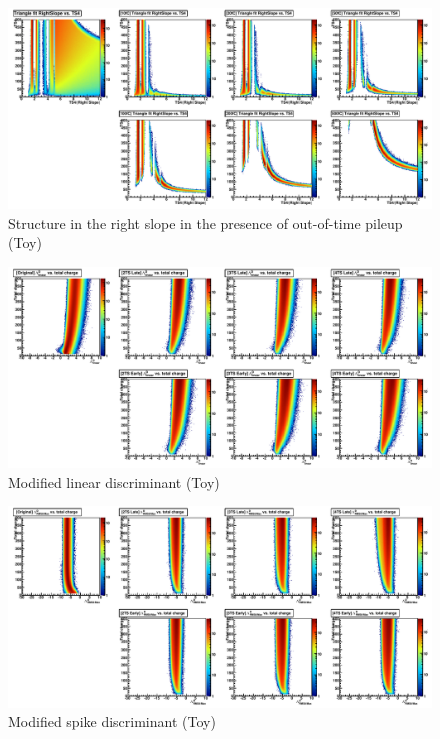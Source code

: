 \begin{figure}
   \includegraphics[width=120mm]{DailyLog/6411/6411_Toys75LateScanRightSlope.pdf}
   \caption{Structure in the right slope in the presence of out-of-time pileup (Toy)}
   \label{Figure_6411_Toys75LateScanRightSlope}
\end{figure}

\begin{figure}
   \includegraphics[width=120mm]{DailyLog/6411/6411_ToysAllChargeLambdaDLinear.pdf}
   \caption{Modified linear discriminant (Toy)}
   \label{Figure_6411_ToysAllChargeLambdaDLinear}
\end{figure}

\begin{figure}
   \includegraphics[width=120mm]{DailyLog/6411/6411_ToysAllChargeLambdaDRMS8Max.pdf}
   \caption{Modified spike discriminant (Toy)}
   \label{Figure_6411_ToysAllChargeLambdaDRMS8Max}
\end{figure}

